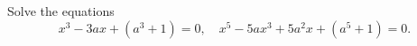 Solve the equations
\[
x^{3} - 3ax + (a^{3} + 1) = 0,\quad
x^{5} - 5ax^{3} + 5a^{2}x + (a^{5} + 1) = 0.
\]

